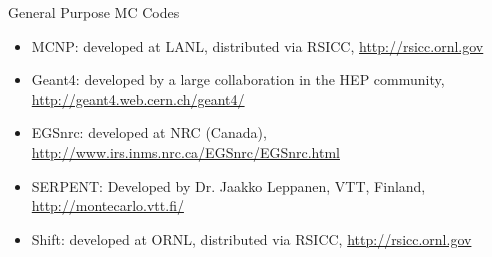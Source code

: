 \documentclass[xcolor=x11names,compress, handout]{beamer}
\renewcommand{\(}{\begin{columns}}
\renewcommand{\)}{\end{columns}}
\newcommand{\<}[1]{\begin{column}{#1}}
\renewcommand{\>}{\end{column}}
\begin{document}
\begin{frame}{General Purpose MC Codes}

\begin{itemize}
\item \alert{MCNP}: developed at LANL, distributed via RSICC, \href{http://rsicc.ornl.gov}{http://rsicc.ornl.gov}
%

\item \alert{Geant4}: developed by a large collaboration in the HEP community, \href{ http://geant4.web.cern.ch/geant4/}{http://geant4.web.cern.ch/geant4/}

\item \alert{EGSnrc}: developed at NRC (Canada), \href{http://www.irs.inms.nrc.ca/EGSnrc/EGSnrc.html}{http://www.irs.inms.nrc.ca/EGSnrc/EGSnrc.html}

\item \alert{SERPENT}: Developed by Dr. Jaakko Leppanen, VTT, Finland, \href{ http://montecarlo.vtt.fi/}{http://montecarlo.vtt.fi/}

\item \alert{Shift}: developed at ORNL, distributed via RSICC, \href{http://rsicc.ornl.gov}{http://rsicc.ornl.gov}

\end{itemize}

\end{frame}
\end{document}
